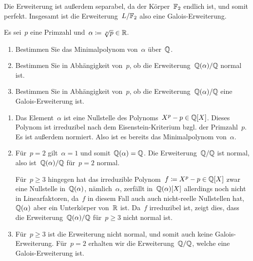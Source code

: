 \documentclass{scrartcl}
\begin{document}
\begin{solution}
\begin{enumerate}
      Die Erweiterung ist außerdem separabel, da der Körper~$\mathbb{F}_2$ endlich ist, und somit perfekt.
      Insgesamt ist die Erweiterung~$L/\mathbb{F}_2$ also eine Galois-Erweiterung.
  \end{enumerate}
\end{solution}

\begin{exercise}[subtitle = {Erstklausur~18/19}]
  Es sei~$p$ eine Primzahl und~$\alpha \coloneqq \sqrt[p]{p} \in \mathbb{R}$.
  \begin{enumerate}
    \item
      Bestimmen Sie das Minimalpolynom von~$\alpha$ über~$\mathbb{Q}$.
    \item
      Bestimmen Sie in Abhängigkeit von~$p$, ob die Erweiterung~$\mathbb{Q}(\alpha) / \mathbb{Q}$ normal ist.
    \item
      Bestimmen Sie in Abhängigkeit von~$p$, ob die Erweiterung~$\mathbb{Q}(\alpha) / \mathbb{Q}$ eine Galois-Erweiterung ist.
  \end{enumerate}
\end{exercise}

\begin{solution}
  \begin{enumerate}
    \item
      Das Element~$\alpha$ ist eine Nullstelle des Polynoms~$X^p - p \in \mathbb{Q}[X]$.
      Dieses Polynom ist irreduzibel nach dem Eisenstein-Kriterium bzgl. der Primzahl~$p$.
      Es ist außerdem normiert.
      Also ist es bereits das Minimalpolynom von~$\alpha$.
    \item
      Für~$p = 2$ gilt~$\alpha = 1$ und somit~$\mathbb{Q}(\alpha) = \mathbb{Q}$.
      Die Erweiterung~$\mathbb{Q} / \mathbb{Q}$ ist normal, also ist~$\mathbb{Q}(\alpha) / \mathbb{Q}$ für~$p = 2$ normal.

      Für~$p \geq 3$ hingegen hat das irreduzible Polynom~$f \coloneqq X^p - p \in \mathbb{Q}[X]$ zwar eine Nullstelle in~$\mathbb{Q}(\alpha)$, nämlich~$\alpha$, zerfällt in~$\mathbb{Q}(\alpha)[X]$ allerdings noch nicht in Linearfaktoren, da~$f$ in diesem Fall auch auch nicht-reelle Nullstellen hat,~$\mathbb{Q}(\alpha)$ aber ein Unterkörper von~$\mathbb{R}$ ist.
      Da~$f$ irreduzibel ist, zeigt dies, dass die Erweiterung~$\mathbb{Q}(\alpha) / \mathbb{Q}$ für~$p \geq 3$ nicht normal ist.
    \item
      Für~$p \geq 3$ ist die Erweiterung nicht normal, und somit auch keine Galois-Erweiterung.
      Für~$p = 2$ erhalten wir die Erweiterung~$\mathbb{Q}/\mathbb{Q}$, welche eine Galois-Erweiterung ist.
  \end{enumerate}
\end{solution}
\end{document}
